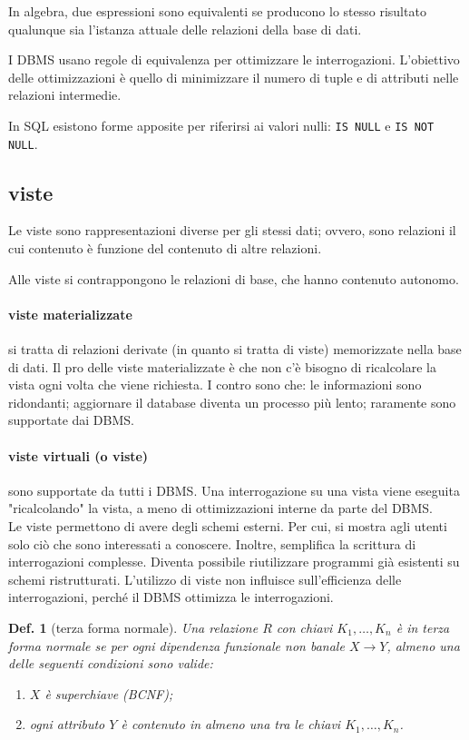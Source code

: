 \documentclass{article}
\newtheorem{definition}{Def.}[section]
\begin{document}
In algebra, due espressioni sono equivalenti se producono lo stesso risultato
qualunque sia l'istanza attuale delle relazioni della base di dati.

I DBMS usano regole di equivalenza per ottimizzare le interrogazioni.
L'obiettivo delle ottimizzazioni è quello di minimizzare il numero di tuple e di
attributi nelle relazioni intermedie.

In SQL esistono forme apposite per riferirsi ai valori nulli: \texttt{IS NULL}
e \texttt{IS NOT NULL}.

\subsection{viste}
Le viste sono rappresentazioni diverse per gli stessi dati; ovvero, sono
relazioni il cui contenuto è funzione del contenuto di altre relazioni.

Alle viste si contrappongono le relazioni di base, che hanno contenuto autonomo.

\paragraph{viste materializzate} si tratta di relazioni derivate (in quanto si
tratta di viste) memorizzate nella base di dati. Il pro delle viste
materializzate è che non c'è bisogno di ricalcolare la vista ogni volta che
viene richiesta. I contro sono che: le informazioni sono ridondanti; aggiornare
il database diventa un processo più lento; raramente sono supportate dai DBMS.

\paragraph{viste virtuali (o viste)} sono supportate da tutti i DBMS. Una
interrogazione su una vista viene eseguita "ricalcolando" la vista, a meno di
ottimizzazioni interne da parte del DBMS.\\

Le viste permettono di avere degli schemi esterni. Per cui, si mostra agli
utenti solo ciò che sono interessati a conoscere. Inoltre, semplifica la
scrittura di interrogazioni complesse. Diventa possibile riutilizzare programmi
già esistenti su schemi ristrutturati. L'utilizzo di viste non influisce
sull'efficienza delle interrogazioni, perché il DBMS ottimizza le
interrogazioni.

\begin{definition}[terza forma normale]
	Una relazione $R$ con chiavi $K_1, \dots, K_n$ è in terza forma normale se 
	per ogni dipendenza funzionale non banale $X \rightarrow Y$, almeno una
	delle seguenti condizioni sono valide:
	\begin{enumerate}
		\item $X$ è superchiave (BCNF);

		\item ogni attributo $Y$ è contenuto in almeno una tra le chiavi $K_1,
			\dots, K_n$.
	\end{enumerate}
\end{definition}
\end{document}
